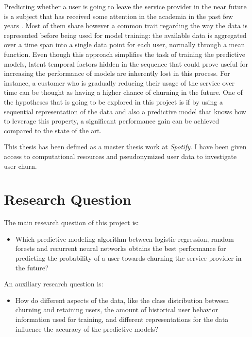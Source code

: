 \documentclass{kththesis}
\begin{document}
	Predicting whether a user is going to leave the service provider in the near future is a subject that has received some attention in the academia in the past few years \citep{Pudipeddi2014}\citep{GurAli2014}\citep{Drachen2016RapidPO}. Most of them share however a common trait regarding the way the data is represented before being used for model training: the available data is aggregated over a time span into a single data point for each user, normally through a mean function. Even though this approach simplifies the task of training the predictive models, latent temporal factors hidden in the sequence that could prove useful for increasing the performance of models are inherently lost in this process. For instance, a customer who is gradually reducing their usage of the service over time  can be thought as having a higher chance of churning in the future. One of the hypotheses that is going to be explored in this project is if by using a sequential representation of the data and also a predictive model that knows how to leverage this property, a significant performance gain can be achieved compared to the state of the art. 
	 
	This thesis has been defined as a master thesis work at \emph{Spotify}. I have been given access to computational resources and pseudonymized user data to investigate user churn.
      
\section{Research Question}	
	
The main research question of this project is:

\begin{itemize}
\item Which predictive modeling algorithm between logistic regression, random forests and recurrent neural networks obtains the best performance for predicting the probability of a user towards churning the service provider in the future?
\end{itemize}	

An auxiliary research question is:

\begin{itemize}
\item How do different aspects of the data, like the class distribution between churning and retaining users, the amount of historical user behavior information used for training, and different representations for the data influence the accuracy of the predictive models?
\end{itemize}
\end{document}
